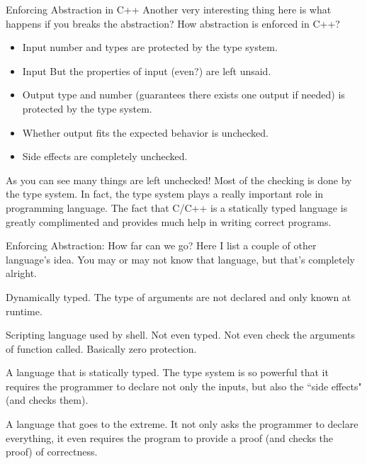 \begin{frame}{Enforcing Abstraction in C++}
Another very interesting thing here is what happens if you breaks the abstraction? How abstraction is enforced in C++?
\begin{itemize}
	\item Input number and types are protected by the type system.
	\item Input But the properties of input (even?) are left unsaid.
	\item Output type and number (guarantees there exists one output if needed) is protected by the type system.
	\item Whether output fits the expected behavior is unchecked.
	\item Side effects are completely unchecked.
\end{itemize}
As you can see many things are left unchecked! Most of the checking is done by the type system. In fact, the type system plays a really important role in programming language.	The fact that C/C++ is a statically typed language is greatly complimented and provides much help in writing correct programs.
\end{frame}

\begin{frame}{Enforcing Abstraction: How far can we go?}
Here I list a couple of other language's idea. You may or may not know that language, but that's completely alright.
\begin{description}
	\item[Matlab/Python] Dynamically typed. The type of arguments are not declared and only known at runtime.
	\item[Bash] Scripting language used by shell. Not even typed. Not even check the arguments of function called. Basically zero protection.
	\item[Haskell] A language that is statically typed. The type system is so powerful that it requires the programmer to declare not only the inputs, but also the ``side effects" (and checks them). 
	\item[COQ] A language that goes to the extreme. It not only asks the programmer to declare everything, it even requires the program to provide a proof (and checks the proof) of correctness.
\end{description}
\end{frame}